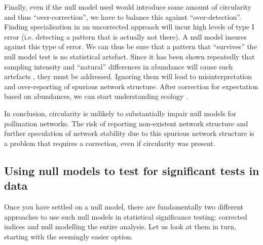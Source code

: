 \documentclass[a4paper, 11pt]{article}\usepackage[]{graphicx}\usepackage[dvipsnames]{xcolor}
\begin{document}
Finally, even if the null model used would introduce some amount of circularity and thus ``over-correction'', we have to balance this against ``over-detection''. Finding specialisation in an uncorrected approach will incur high levels of type I error (i.e. detecting a pattern that is actually not there). A null model insures against this type of error. We can thus be sure that a pattern that ``survives'' the null model test is no statistical artefact. Since it has been shown repeatedly that sampling intensity and ``natural'' differences in abundance will cause such artefacts \citep{Dormann2009,Bluthgen2010,Joppa2009,Bluthgen2008}, they must be addressed. Ignoring them will lead to misinterpretation and over-reporting of spurious network structure. After correction for expectation based on abundances, we can start understanding ecology \citep{Vazquez2007}.

In conclusion, circularity is unlikely to substantially impair null models for pollination networks. The risk of reporting non-existent network structure and further speculation of network stability due to this spurious network structure is a problem that requires a correction, even if circularity was present.



\subsection{Using null models to test for significant tests in data}\label{sec:nullmodels}
Once you have settled on a null model, there are fundamentally two different approaches to use such null models in statistical significance testing: corrected indices and null modelling the entire analysis. Let us look at them in turn, starting with the seemingly easier option.
\end{document}
